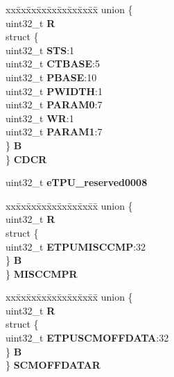 \begin{DoxyCompactItemize}
\begin{tabbing}
\end{tabbing}\item 
\mbox{\label{structETPU__tag_a8e670d74230c687f661e0029c33f60d8}} 
\begin{tabbing}
xx\=xx\=xx\=xx\=xx\=xx\=xx\=xx\=xx\=\kill
union \{\\
\>uint32\_t {\bfseries R}\\
\>struct \{\\
\>\>uint32\_t {\bfseries STS}:1\\
\>\>uint32\_t {\bfseries CTBASE}:5\\
\>\>uint32\_t {\bfseries PBASE}:10\\
\>\>uint32\_t {\bfseries PWIDTH}:1\\
\>\>uint32\_t {\bfseries PARAM0}:7\\
\>\>uint32\_t {\bfseries WR}:1\\
\>\>uint32\_t {\bfseries PARAM1}:7\\
\>\} {\bfseries B}\\
\} {\bfseries CDCR}\\

\end{tabbing}\item 
\mbox{\label{structETPU__tag_a01f9ed201055adfbc7b84a313b311bdb}} 
uint32\+\_\+t {\bfseries e\+T\+P\+U\+\_\+reserved0008}
\item 
\mbox{\label{structETPU__tag_a097e723146862661ba8e4310d2550c1c}} 
\begin{tabbing}
xx\=xx\=xx\=xx\=xx\=xx\=xx\=xx\=xx\=\kill
union \{\\
\>uint32\_t {\bfseries R}\\
\>struct \{\\
\>\>uint32\_t {\bfseries ETPUMISCCMP}:32\\
\>\} {\bfseries B}\\
\} {\bfseries MISCCMPR}\\

\end{tabbing}\item 
\mbox{\label{structETPU__tag_a78f6cccfd87cf3c99709a65c57316d69}} 
\begin{tabbing}
xx\=xx\=xx\=xx\=xx\=xx\=xx\=xx\=xx\=\kill
union \{\\
\>uint32\_t {\bfseries R}\\
\>struct \{\\
\>\>uint32\_t {\bfseries ETPUSCMOFFDATA}:32\\
\>\} {\bfseries B}\\
\} {\bfseries SCMOFFDATAR}\\


\end{tabbing}
\end{DoxyCompactItemize}
